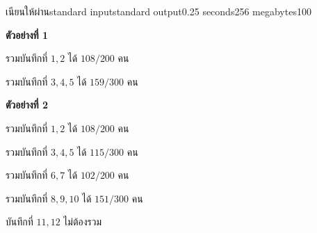 \documentclass[11pt,a4paper]{article}
\begin{document}
\begin{problem}{เนียนให้ผ่าน}{standard input}{standard output}{0.25 seconds}{256 megabytes}{100}
\Note
\begin{note}
\textbf{ตัวอย่างที่ 1}

รวมบันทึกที่ $1,2$ ได้ $108/200$ คน

รวมบันทึกที่ $3,4,5$ ได้ $159/300$ คน

\textbf{ตัวอย่างที่ 2}

รวมบันทึกที่ $1,2$ ได้ $108/200$ คน

รวมบันทึกที่ $3,4,5$ ได้ $115/300$ คน

รวมบันทึกที่ $6,7$ ได้ $102/200$ คน

รวมบันทึกที่ $8,9,10$ ได้ $151/300$ คน

บันทึกที่ $11,12$ ไม่ต้องรวม

\end{note}


\end{problem}
\end{document}
